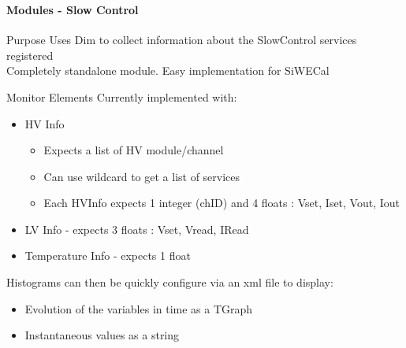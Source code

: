 \documentclass[8pt]{beamer}
\begin{document}
  \begin{frame}
  \frametitle{\secname}
  \framesubtitle{Modules - Slow Control}

    \begin{block}{Purpose}
      Uses Dim to collect information about the SlowControl services registered\\
      Completely standalone module. Easy implementation for SiWECal
    \end{block}

    \begin{block}{Monitor Elements}
    Currently implemented with:
      \begin{itemize}
        \item HV Info
          \begin{itemize}
            \item Expects a list of HV module/channel
            \item Can use wildcard to get a list of services
            \item Each HVInfo expects 1 integer (chID) and 4 floats : Vset, Iset, Vout, Iout
          \end{itemize}
        \item LV Info - expects 3 floats : Vset, Vread, IRead
        \item Temperature Info - expects 1 float\\
      \end{itemize}

    Histograms can then be quickly configure via an xml file to display:
      \begin{itemize}
        \item Evolution of the variables in time as a TGraph
        \item Instantaneous values as a string
      \end{itemize}
    \end{block}

  \end{frame}
\end{document}
